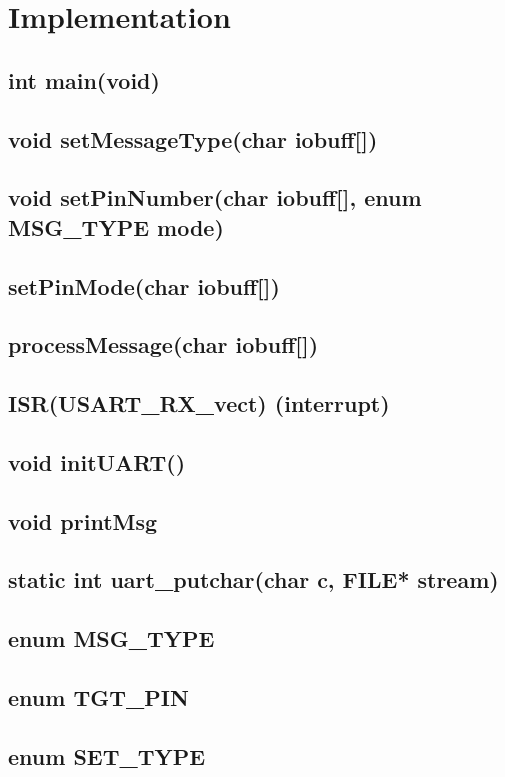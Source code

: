 \documentclass[letterpaper,11pt]{texMemo} %
\begin{document}
\newpage
\section*{Implementation}

\subsection*{int main(void)}
\subsection*{void setMessageType(char iobuff[])}
\subsection*{void setPinNumber(char iobuff[], enum MSG_TYPE mode)}
\subsection*{setPinMode(char iobuff[])}
\subsection*{processMessage(char iobuff[])}
\subsection*{ISR(USART_RX_vect) (interrupt)}
\subsection*{void initUART()}
\subsection*{void printMsg}
\subsection*{static int uart_putchar(char c, FILE* stream)}
\subsection*{enum MSG_TYPE}
\subsection*{enum TGT_PIN}
\subsection*{enum SET_TYPE}
\end{document}
